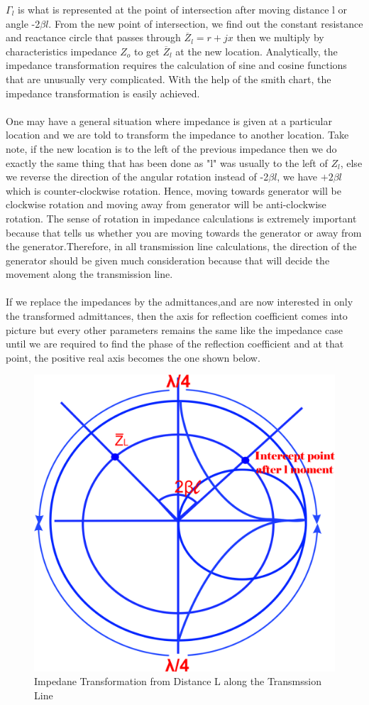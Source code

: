  $\Gamma_{l}$ is what is represented at the point of intersection after moving distance l or angle -2$\beta{l}$. From the new point of  intersection, we find out the constant resistance and reactance circle that passes through $\overline{Z}_{l} = r + jx$ then we multiply by characteristics impedance $Z_o$ to get $\overline{Z}_{l}$ at the new location. Analytically, the impedance transformation requires the calculation of sine and cosine functions that are unusually very complicated. With the help of the smith chart, the impedance transformation is easily achieved.\\\\
  One may have a general situation where impedance is given at a particular location and we are told to transform the impedance to another location. Take note, if the new location is to the left of the previous impedance then we do exactly the same thing that has been done as "l" was usually to the left of $Z_{l}$, else we reverse the direction of the angular rotation instead of -2$\beta{l}$, we have $+2\beta{l}$ which is counter-clockwise rotation. Hence, moving towards generator will be clockwise rotation and moving away from generator will be anti-clockwise rotation. The sense of rotation in impedance calculations is extremely important because that tells us whether you are moving towards the generator or away from the generator.Therefore, in all transmission line calculations, the direction of the generator should be given much consideration because that will decide the movement along the transmission line. \\\\
  If we replace the impedances by the admittances,and are now interested in only the transformed admittances, then the axis for reflection coefficient comes into picture but every other parameters remains the same like the impedance case until we are required to find the phase of the reflection coefficient and at that point, the positive real axis becomes the one shown below.
\begin{figure}[h]
\centering
\includegraphics[width=0.5\linewidth]{./graphics/mjhtre}
\caption{Impedane Transformation from Distance L along the Transmssion Line}
\label{fig:mjhtre}
\end{figure}
 

